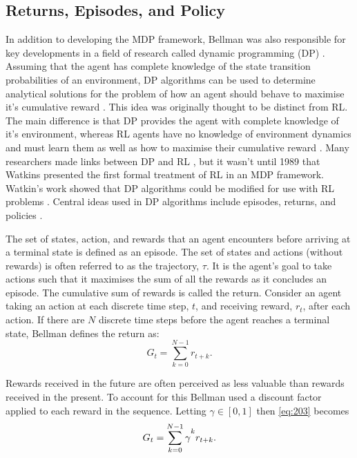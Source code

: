 \subsection{Returns, Episodes, and Policy} \label{rep}
In addition to  developing the MDP framework, Bellman was also responsible for key developments in a field of research called dynamic programming (DP) \cite{Bellm1954}. Assuming that the agent has complete knowledge of the state transition probabilities of an environment, DP algorithms can be used to determine analytical solutions for the problem of how an agent should behave to maximise it's cumulative reward \cite{Bellm1954, Howard1960}. This idea was originally thought to be distinct from RL. The main difference is that DP provides the agent with complete knowledge of it's environment, whereas RL agents have no knowledge of environment dynamics and must learn them as well as how to maximise their cumulative reward \cite{Sutton2018}. Many researchers made links between DP and RL \cite{Bellm1959, Witten1977, Werbos1987}, but it wasn't until 1989 that Watkins presented the first formal treatment of RL in an MDP framework. Watkin's work showed that DP algorithms could be modified for use with RL problems \cite{Watkins1989}. Central ideas used in DP algorithms include episodes, returns, and policies \cite{Sutton2018}.

The set of states, action, and rewards that an agent encounters before arriving at a terminal state is defined as an episode. The set of states and actions (without rewards) is often referred to as the trajectory, $\tau$. It is the agent's goal to take actions such that it maximises the sum of all the rewards as it concludes an episode. The cumulative sum of rewards is called the return. Consider an agent taking an action at each discrete time step, $t$, and receiving reward, $r_t$, after each action. If there are $N$ discrete time steps before the agent reaches a terminal state, Bellman defines the return as:
\begin{equation}
	G_t = \sum_{k = 0}^{N-1} r_{t + k}. \label{eq:203}
\end{equation}

Rewards received in the future are often perceived as less valuable than rewards received in the present. To account for this Bellman used a discount factor applied to each reward in the sequence. Letting $\gamma \in [0,1]$ then \ref{eq:203} becomes
\begin{equation}
	G_t = \sum_{k = 0}^{N-1}\gamma\mystrut^k r_{t+k}. \label{eq:204}
\end{equation}

